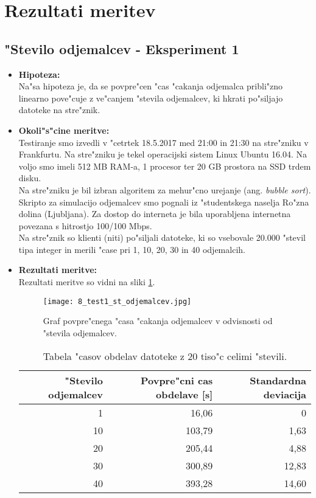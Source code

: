 \newpage
\section{Rezultati meritev}


\subsection{"Stevilo odjemalcev - Eksperiment 1}
\begin{itemize}
	\item \textbf{Hipoteza: }  \\
		Na"sa hipoteza je, da se povpre"cen "cas "cakanja odjemalca pribli"zno linearno pove"cuje z ve"canjem "stevila odjemalcev, ki hkrati po"siljajo datoteke na stre"znik.

	\item \textbf{Okoli"s"cine meritve: } \\
		Testiranje smo izvedli v "cetrtek 18.5.2017 med 21:00 in 21:30 na stre"zniku v Frankfurtu. Na stre"zniku je tekel operacijski sistem Linux Ubuntu 16.04. Na voljo smo imeli 512 MB RAM-a, 1 procesor ter 20 GB prostora na SSD trdem disku.\\Na stre"zniku je bil izbran algoritem za mehur"cno urejanje (ang. \textit{bubble sort}). Skripto za simulacijo odjemalcev smo pognali iz "studentskega naselja Ro"zna dolina (Ljubljana). Za dostop do interneta je bila uporabljena internetna povezana s hitrostjo 100/100 Mbps.\\ Na stre"znik so klienti (niti) po"siljali datoteke, ki so vsebovale 20.000 "stevil tipa integer in merili "case pri 1, 10, 20, 30 in 40 odjemalcih.

 	\item \textbf{Rezultati meritve: }  \\
	Rezultati meritve so vidni na sliki \ref{8_graf_1_rez}.
	\begin{figure}[!htb]
  	\centering
  	  \texttt{[image: 8\_test1\_st\_odjemalcev.jpg]}
  	\caption{Graf povpre"cnega "casa "cakanja odjemalcev v odvisnosti od "stevila odjemalcev.}
  	\label{8_graf_1_rez}
	\end{figure}

	\begin{table}[!htbp]
  	\centering
  	\begin{tabular}{ | r | r | r | }
    	\hline
    	"Stevilo odjemalcev & Povpre"cni cas obdelave [s] & Standardna deviacija\\ \hline
    	1 & 16,06     & 0 \\ \hline
    	10 & 103,79 & 1,63\\ \hline
    	20 & 205,44 & 4,88\\ \hline
    	30 & 300,89 & 12,83\\ \hline
    	40 & 393,28 & 14,60\\ \hline
  	\end{tabular}
  	\caption{Tabela "casov obdelav datoteke z 20 tiso"c celimi "stevili.}
  	\label{8_table2}
  	\centering
	\end{table}


\end{itemize}
